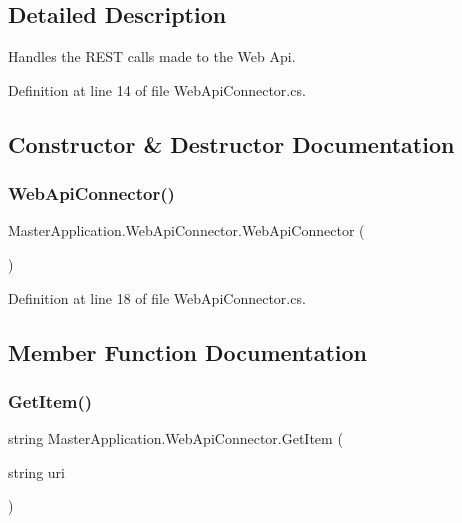 \subsection{Detailed Description}
Handles the R\+E\+ST calls made to the Web Api. 

Definition at line 14 of file Web\+Api\+Connector.\+cs.



\subsection{Constructor \& Destructor Documentation}
\mbox{\label{class_master_application_1_1_web_api_connector_a2bc913b7f0eda0a71a83d9adda6578a2}} 
\subsubsection{\texorpdfstring{Web\+Api\+Connector()}{WebApiConnector()}}
{\footnotesize\ttfamily Master\+Application.\+Web\+Api\+Connector.\+Web\+Api\+Connector (\begin{DoxyParamCaption}{ }\end{DoxyParamCaption})}



Definition at line 18 of file Web\+Api\+Connector.\+cs.



\subsection{Member Function Documentation}
\mbox{\label{class_master_application_1_1_web_api_connector_a2560aa84d88a9dc94d3d5a2d5844d0d5}} 
\subsubsection{\texorpdfstring{Get\+Item()}{GetItem()}}
{\footnotesize\ttfamily string Master\+Application.\+Web\+Api\+Connector.\+Get\+Item (\begin{DoxyParamCaption}\item[{string}]{uri }\end{DoxyParamCaption})}



